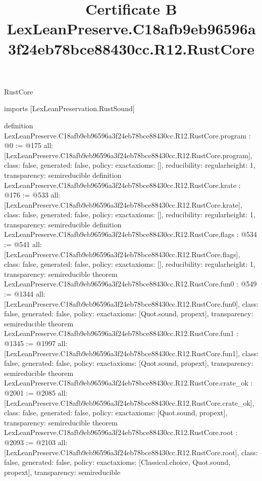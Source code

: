 \begin{lexlean}{RustCore}
\title{Certificate B LexLeanPreserve.C18afb9eb96596a3f24eb78bce88430cc.R12.RustCore}
\begin{coremodule}
imports [LexLeanPreservation.RustSound]

definition LexLeanPreserve.C18afb9eb96596a3f24eb78bce88430cc.R12.RustCore.program : @0 := @175 {
  all: [LexLeanPreserve.C18afb9eb96596a3f24eb78bce88430cc.R12.RustCore.program],
  class: false,
  generated: false,
  policy: exact{axioms: []},
  reducibility: regular{height: 1},
  transparency: semireducible
}
definition LexLeanPreserve.C18afb9eb96596a3f24eb78bce88430cc.R12.RustCore.krate : @176 := @533 {
  all: [LexLeanPreserve.C18afb9eb96596a3f24eb78bce88430cc.R12.RustCore.krate],
  class: false,
  generated: false,
  policy: exact{axioms: []},
  reducibility: regular{height: 1},
  transparency: semireducible
}
definition LexLeanPreserve.C18afb9eb96596a3f24eb78bce88430cc.R12.RustCore.flags : @534 := @541 {
  all: [LexLeanPreserve.C18afb9eb96596a3f24eb78bce88430cc.R12.RustCore.flags],
  class: false,
  generated: false,
  policy: exact{axioms: []},
  reducibility: regular{height: 1},
  transparency: semireducible
}
theorem LexLeanPreserve.C18afb9eb96596a3f24eb78bce88430cc.R12.RustCore.fun0 : @549 := @1344 {
  all: [LexLeanPreserve.C18afb9eb96596a3f24eb78bce88430cc.R12.RustCore.fun0],
  class: false,
  generated: false,
  policy: exact{axioms: [Quot.sound, propext]},
  transparency: semireducible
}
theorem LexLeanPreserve.C18afb9eb96596a3f24eb78bce88430cc.R12.RustCore.fun1 : @1345 := @1997 {
  all: [LexLeanPreserve.C18afb9eb96596a3f24eb78bce88430cc.R12.RustCore.fun1],
  class: false,
  generated: false,
  policy: exact{axioms: [Quot.sound, propext]},
  transparency: semireducible
}
theorem LexLeanPreserve.C18afb9eb96596a3f24eb78bce88430cc.R12.RustCore.crate_ok : @2001 := @2085 {
  all: [LexLeanPreserve.C18afb9eb96596a3f24eb78bce88430cc.R12.RustCore.crate_ok],
  class: false,
  generated: false,
  policy: exact{axioms: [Quot.sound, propext]},
  transparency: semireducible
}
theorem LexLeanPreserve.C18afb9eb96596a3f24eb78bce88430cc.R12.RustCore.root : @2093 := @2103 {
  all: [LexLeanPreserve.C18afb9eb96596a3f24eb78bce88430cc.R12.RustCore.root],
  class: false,
  generated: false,
  policy: exact{axioms: [Classical.choice, Quot.sound, propext]},
  transparency: semireducible
}


\end{coremodule}
\end{lexlean}

